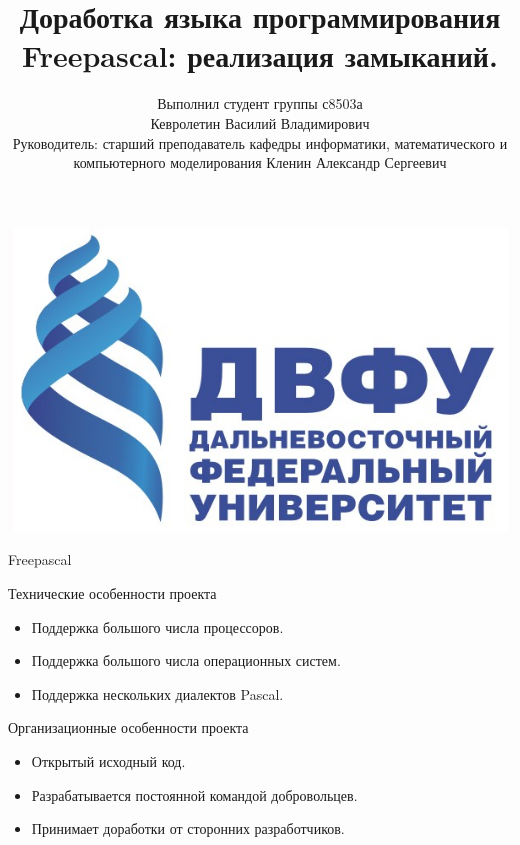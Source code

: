 \documentclass[roman,12pt]{beamer}
\begin{document}
\title{Доработка языка программирования Freepascal: реализация замыканий.}  
\author{Выполнил студент группы с8503а \\ Кевролетин Василий
  Владимирович\\ Руководитель: старший преподаватель кафедры
  информатики, математического и компьютерного моделирования Кленин
  Александр Сергеевич}

\begin{frame}
\begin{center}
\includegraphics[scale=0.15]{logo.jpeg}
\end{center}
\maketitle

\end{frame}

\begin{frame}{Freepascal}
  \begin{block}{Технические особенности проекта}
    \begin{itemize}
    \item Поддержка большого числа процессоров.
    \item Поддержка большого числа операционных систем.
    \item Поддержка нескольких диалектов Pascal.
    \end{itemize}
  \end{block}
  \begin{block}{Организационные особенности проекта}
    \begin{itemize}
    \item Открытый исходный код.
    \item Разрабатывается постоянной командой добровольцев.
    \item Принимает доработки от сторонних разработчиков.
    \end{itemize}  
  \end{block}
\end{frame}
\end{document}
